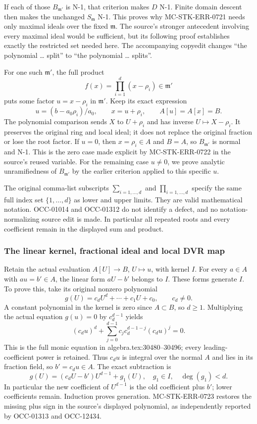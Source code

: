 If each of those \(B_{\mathfrak m'}\) is N-1, that criterion makes \(D\) N-1. Finite domain descent then makes the unchanged \(S_{\mathfrak m}\) N-1. This proves why MC-STK-ERR-0721 needs only maximal ideals over the fixed \(\mathfrak m\). The source's stronger antecedent involving every maximal ideal would be sufficient, but its following proof establishes exactly the restricted set needed here. The accompanying copyedit changes ``the polynomial \ldots{} split'' to ``the polynomial \ldots{} splits''.

For one such \(\mathfrak m'\), the full product \[
 f(x)=\prod_{i=1}^{d}(x-\rho_i)\in\mathfrak m'
\] puts some factor \(u=x-\rho_i\) in \(\mathfrak m'\). Keep its exact expression \[
 u=(b-a_0\rho_i)/a_0,\qquad x=u+\rho_i,
 \qquad A[u]=A[x]=B.
\] The polynomial comparison sends \(X\) to \(U+\rho_i\) and has inverse \(U\mapsto X-\rho_i\). It preserves the original ring and local ideal; it does not replace the original fraction or lose the root factor. If \(u=0\), then \(x=\rho_i\in A\) and \(B=A\), so \(B_{\mathfrak m'}\) is normal and N-1. This is the zero case made explicit by MC-STK-ERR-0722 in the source's reused variable. For the remaining case \(u\ne0\), we prove analytic unramifiedness of \(B_{\mathfrak m'}\) by the earlier criterion applied to this specific \(u\).

The original comma-list subscripts \(\sum_{i=1,\ldots,d}\) and \(\prod_{i=1,\ldots,d}\) specify the same full index set \(\{1,\ldots,d\}\) as lower and upper limits. They are valid mathematical notation. OCC-01014 and OCC-01312 do not identify a defect, and no notation-normalizing source edit is made. In particular all repeated roots and every coefficient remain in the displayed sum and product.

\subsubsection{The linear kernel, fractional ideal and local DVR map}\label{the-linear-kernel-fractional-ideal-and-local-dvr-map}

Retain the actual evaluation \(A[U]\to B\), \(U\mapsto u\), with kernel \(I\). For every \(a\in A\) with \(au=b'\in A\), the linear form \(aU-b'\) belongs to \(I\). These forms generate \(I\). To prove this, take its original nonzero polynomial \[
 g(U)=c_dU^d+\cdots+c_1U+c_0,\qquad c_d\ne0.
\] A constant polynomial in the kernel is zero since \(A\subset B\), so \(d\geq1\). Multiplying the actual equation \(g(u)=0\) by \(c_d^{d-1}\) yields \[
 (c_du)^d+\sum_{j=0}^{d-1}c_jc_d^{d-1-j}(c_du)^j=0.
\] This is the full monic equation in algebra.tex:30480--30496; every leading-coefficient power is retained. Thus \(c_du\) is integral over the normal \(A\) and lies in its fraction field, so \(b'=c_du\in A\). The exact subtraction is \[
 g(U)=(c_dU-b')U^{d-1}+g_1(U),
 \quad g_1\in I,\quad\deg(g_1)<d.
\] In particular the new coefficient of \(U^{d-1}\) is the old coefficient plus \(b'\); lower coefficients remain. Induction proves generation. MC-STK-ERR-0723 restores the missing plus sign in the source's displayed polynomial, as independently reported by OCC-01313 and OCC-12434.

